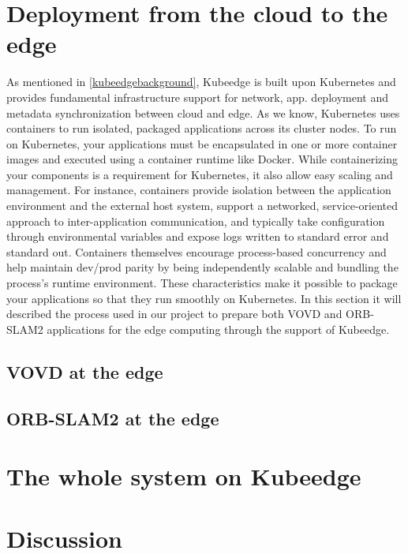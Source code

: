 \section{Deployment from the cloud to the edge} %
As mentioned in \ref{kubeedgebackground}, Kubeedge is built upon Kubernetes and provides fundamental infrastructure support for network, app. deployment and metadata synchronization between cloud and edge. As we know, Kubernetes uses containers to run isolated, packaged applications across its cluster nodes. To run on Kubernetes, your applications must be encapsulated in one or more container images and executed using a container runtime like Docker. While containerizing your components is a requirement for Kubernetes, it also allow easy scaling and management. For instance, containers provide isolation between the application environment and the external host system, support a networked, service-oriented approach to inter-application communication, and typically take configuration through environmental variables and expose logs written to standard error and standard out. Containers themselves encourage process-based concurrency and help maintain dev/prod parity by being independently scalable and bundling the process’s runtime environment. These characteristics make it possible to package your applications so that they run smoothly on Kubernetes. In this section it will described the process used in our project to prepare both VOVD and ORB-SLAM2 applications for the edge computing through the support of Kubeedge.


\subsection{VOVD at the edge}


\subsection{ORB-SLAM2 at the edge}

\section{The whole system on Kubeedge}



\section{Discussion}



\clearpage
\thispagestyle{empty}